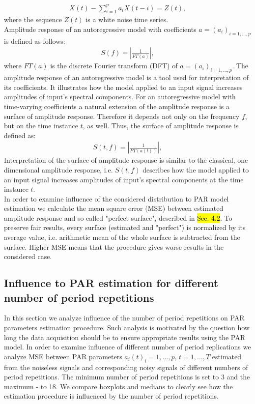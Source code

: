 \begin{eqnarray}
X(t)-\sum^{p}_{i=1}a_i X(t-i)=Z(t),
\end{eqnarray}
where the sequence ${Z(t)}$ is a white noise time series.\\
Amplitude response of an autoregressive model with coefficients $a=(a_i)_{i=1,\ldots,p}$ is defined as follows:
\begin{eqnarray}
S(f)=\left|\frac{1}{FT(a)}\right|,
\end{eqnarray}
where $FT(a)$ is the discrete Fourier transform (DFT) of $a=(a_i)_{i=1,\ldots,p}$. The amplitude response of an autoregressive model is a tool used for interpretation of its coefficients. It illustrates how the model applied to an input signal increases amplitudes of input’s spectral components. For an autoregressive model with time-varying coefficients a natural extension of the amplitude response is a surface of amplitude response. Therefore it depends not only on the frequency $f$, but on the time instance $t$, as well. Thus, the surface of amplitude response is defined as:
\begin{eqnarray}
S(t,f)=\left|\frac{1}{FT\left(a(t)\right)}\right|,
\end{eqnarray}
Interpretation of the surface of amplitude response is similar to the classical, one dimensional amplitude response, i.e. $S(t,f)$ describes how the model applied to an input signal increases amplitudes of input's spectral components at the time instance $t$.\\
In order to examine influence of the considered distribution to PAR model estimation we calculate the mean square error (MSE) between estimated amplitude response and so called "perfect surface", described in \hl{Sec. 4.2}. To preserve fair results, every surface (estimated and "perfect") is normalized by its average value, i.e. arithmetic mean of the whole surface is subtracted from the surface. Higher MSE means that the procedure gives worse results in the considered case.
\FloatBarrier

\subsection{Influence  to PAR estimation for different number of period repetitions}

In this section we analyze influence of the number of period repetitions on PAR parameters estimation procedure. Such analysis is motivated by the question how long the data acquisition should be to ensure appropriate results using the PAR model. In order to examine influence of different number of period replications we analyze MSE between PAR parameters ${a_i(t)}_i=1,\ldots,p,\, t=1,\ldots,T$ estimated from the noiseless signals and corresponding noisy signals of different numbers of period repetitions. The minimum number of period repetitions is set to 3 and the maximum - to 18. We compare boxplots and medians to clearly see how the estimation procedure is influenced by the number of period repetitions.

\FloatBarrier